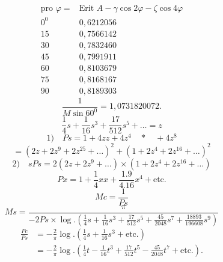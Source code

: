 \clearpage
{}
\[\begin{array}{r|r}
\text{pro }\varphi=&\text{Erit }A-\gamma\cos2\varphi-\zeta\cos4\varphi\\
0^0&0{,}6212056\\
15&0{,}7566142\\
30&0{,}7832460\\
45&0{,}7991911\\
60&0{,}8103679\\
75&0{,}8168167\\
90&0{,}8189303
\end{array}\]
\[\frac1{M\sin60^0}=1{,}0731820072.\]
\ClosingRule
{}
\noindent [S. 13]
\begin{equation}\tag*{[32]}\frac14s+\frac1{16}s^3+\frac{17}{512}s^5+\ldots=z\end{equation}
\begin{equation}\tag*{[33]}\text{1)}\quad Ps=1+4zz+4z^4\quad *\quad+4z^8\end{equation}
\begin{equation}\tag*{[34]}=(2z+2z^9+2z^{25}+\ldots)^2+(1+2z^4+2z^{16}+\ldots)^2\end{equation}
\begin{equation}\tag*{[35]}\text{2)}\quad sPs=2(2z+2z^9+\ldots)\times(1+2z^4+2z^{16}+\ldots)\end{equation}
\begin{equation}\tag*{[36]}Px=1+\frac14xx+\frac{1.9}{4.16}x^4+\text{etc.}\end{equation}
\begin{equation}\tag*{[37]}Mc=\frac1{Ps}\end{equation}
{\small\begin{equation}\tag*{[38]}Ms=\frac{\pi}{-2Ps\times\log.\left(\frac14s+\frac1{16}s^3+\frac{17}{512}s^5+\frac{45}{2048}s^7+\frac{18893}{196608}s^9\right)}\end{equation}}
\begin{equation}\tag*{[39]}\begin{aligned}
\frac{Pc}{Ps}&=-\frac2\pi\log.\left(\frac14s+\frac1{16}s^3+\text{etc.}\right)\\
&=-\frac2\pi\log.\left(\frac14t-\frac1{16}t^3+\frac{17}{512}t^5-\frac{45}{2048}t^7+\text{etc.}\right).
\end{aligned}\end{equation}
\clearpage
{}
\noindent [S. 14]
